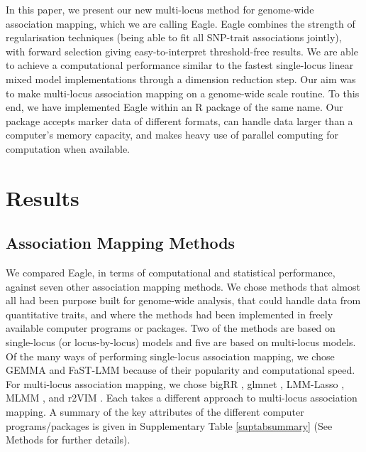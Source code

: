 \documentclass{nature}
\begin{document}
In this paper, we present our new multi-locus method for genome-wide association mapping, which we are calling Eagle. 
Eagle combines the strength of regularisation techniques (being able to fit all SNP-trait associations jointly), with forward selection giving easy-to-interpret threshold-free results.   We are able to achieve a computational performance similar to the fastest single-locus linear mixed model implementations 
through a dimension reduction step.
Our aim was to make multi-locus association mapping on a genome-wide scale routine. To this end, we have implemented Eagle 
within an R package of the same name. 
Our package accepts marker data of different 
formats,  can handle data larger than a computer's  memory capacity, and makes heavy use of 
parallel computing for computation when available.  


\section{Results}

\subsection{Association Mapping Methods}

We compared Eagle, in terms of computational and statistical performance, against seven other association mapping methods. 
We chose methods that almost all had been purpose built for genome-wide analysis, that could handle data from quantitative traits, and where the methods had been implemented in freely available computer programs or packages. Two of the methods are based on single-locus (or locus-by-locus) models and five are based on multi-locus models. Of the many ways of performing single-locus association mapping, we chose 
GEMMA \cite{zhou2012genome}  and FaST-LMM \cite{lippert2011fast} because of their popularity and computational speed. 
For multi-locus association mapping, we chose bigRR \cite{shen2013novel}, glmnet \cite{Friedman2010glmnet}, 
LMM-Lasso \cite{rakitsch2013lasso}, MLMM \cite{segura2012efficient} , and r2VIM \cite{szymczak2016r2vim}.  
Each takes a different approach to multi-locus association mapping. A summary of the key attributes of the different computer programs/packages 
is given in Supplementary Table \ref{suptabsummary} (See Methods for further details). 

 
\end{document}
